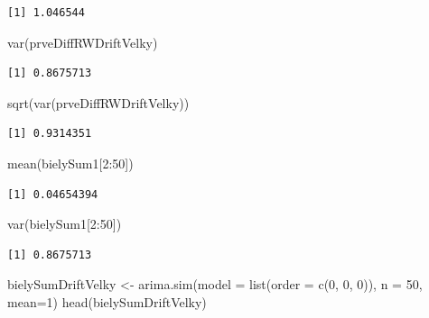 \documentclass[
  letterpaper,
  DIV=11,
  numbers=noendperiod]{scrreprt}
\newenvironment{Shaded}{\begin{snugshade}}{\end{snugshade}}
\newcommand{\AttributeTok}[1]{\textcolor[rgb]{0.40,0.45,0.13}{#1}}
\newcommand{\DecValTok}[1]{\textcolor[rgb]{0.68,0.00,0.00}{#1}}
\newcommand{\FunctionTok}[1]{\textcolor[rgb]{0.28,0.35,0.67}{#1}}
\newcommand{\NormalTok}[1]{\textcolor[rgb]{0.00,0.23,0.31}{#1}}
\newcommand{\OtherTok}[1]{\textcolor[rgb]{0.00,0.23,0.31}{#1}}
\newcommand{\SpecialCharTok}[1]{\textcolor[rgb]{0.37,0.37,0.37}{#1}}
\begin{document}
\begin{verbatim}
[1] 1.046544
\end{verbatim}

\begin{Shaded}
\begin{Highlighting}[]
\FunctionTok{var}\NormalTok{(prveDiffRWDriftVelky)}
\end{Highlighting}
\end{Shaded}

\begin{verbatim}
[1] 0.8675713
\end{verbatim}

\begin{Shaded}
\begin{Highlighting}[]
\FunctionTok{sqrt}\NormalTok{(}\FunctionTok{var}\NormalTok{(prveDiffRWDriftVelky))}
\end{Highlighting}
\end{Shaded}

\begin{verbatim}
[1] 0.9314351
\end{verbatim}

\begin{Shaded}
\begin{Highlighting}[]
\FunctionTok{mean}\NormalTok{(bielySum1[}\DecValTok{2}\SpecialCharTok{:}\DecValTok{50}\NormalTok{])}
\end{Highlighting}
\end{Shaded}

\begin{verbatim}
[1] 0.04654394
\end{verbatim}

\begin{Shaded}
\begin{Highlighting}[]
\FunctionTok{var}\NormalTok{(bielySum1[}\DecValTok{2}\SpecialCharTok{:}\DecValTok{50}\NormalTok{])}
\end{Highlighting}
\end{Shaded}

\begin{verbatim}
[1] 0.8675713
\end{verbatim}

\begin{Shaded}
\begin{Highlighting}[]
\NormalTok{bielySumDriftVelky }\OtherTok{\textless{}{-}} \FunctionTok{arima.sim}\NormalTok{(}\AttributeTok{model =} \FunctionTok{list}\NormalTok{(}\AttributeTok{order =} \FunctionTok{c}\NormalTok{(}\DecValTok{0}\NormalTok{, }\DecValTok{0}\NormalTok{, }\DecValTok{0}\NormalTok{)), }\AttributeTok{n =} \DecValTok{50}\NormalTok{, }\AttributeTok{mean=}\DecValTok{1}\NormalTok{)}
\FunctionTok{head}\NormalTok{(bielySumDriftVelky)}
\end{Highlighting}
\end{Shaded}
\end{document}
